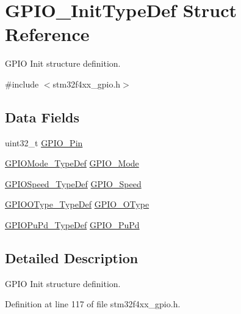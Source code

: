 \hypertarget{struct_g_p_i_o___init_type_def}{\section{G\-P\-I\-O\-\_\-\-Init\-Type\-Def Struct Reference}
\label{struct_g_p_i_o___init_type_def}
}


G\-P\-I\-O Init structure definition.  




{\ttfamily \#include $<$stm32f4xx\-\_\-gpio.\-h$>$}

\subsection*{Data Fields}
\begin{DoxyCompactItemize}
\item 
uint32\-\_\-t \hyperlink{struct_g_p_i_o___init_type_def_a15699fc7e215ac2579cd24ca76cd4591}{G\-P\-I\-O\-\_\-\-Pin}
\item 
\hyperlink{group___g_p_i_o_ga1347339e1c84a196fabbb31205eec5d4}{G\-P\-I\-O\-Mode\-\_\-\-Type\-Def} \hyperlink{struct_g_p_i_o___init_type_def_a0c7e8901d8b511bbb8c3b153f705dbba}{G\-P\-I\-O\-\_\-\-Mode}
\item 
\hyperlink{group___g_p_i_o_ga062ad92b67b4a1f301c161022cf3ba8e}{G\-P\-I\-O\-Speed\-\_\-\-Type\-Def} \hyperlink{struct_g_p_i_o___init_type_def_a57b08335216f50618ebc080e4fbb0a80}{G\-P\-I\-O\-\_\-\-Speed}
\item 
\hyperlink{group___g_p_i_o_gae74212e8d66c389f47326b06bdf6d2ab}{G\-P\-I\-O\-O\-Type\-\_\-\-Type\-Def} \hyperlink{struct_g_p_i_o___init_type_def_a321a268abbed3d2f01c27383e8daf92d}{G\-P\-I\-O\-\_\-\-O\-Type}
\item 
\hyperlink{group___g_p_i_o_gafb7ecd99c44b4fd702d669304a36c2c8}{G\-P\-I\-O\-Pu\-Pd\-\_\-\-Type\-Def} \hyperlink{struct_g_p_i_o___init_type_def_aeb0168ffc465346d21f3120aec320b72}{G\-P\-I\-O\-\_\-\-Pu\-Pd}
\end{DoxyCompactItemize}


\subsection{Detailed Description}
G\-P\-I\-O Init structure definition. 

Definition at line 117 of file stm32f4xx\-\_\-gpio.\-h.



